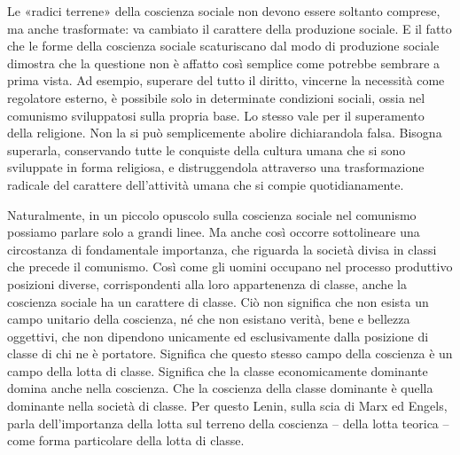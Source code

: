 \documentclass[12pt,a4paper,openany]{book}
\begin{document}
Le «radici terrene» della coscienza sociale non devono essere soltanto comprese, ma anche trasformate: va cambiato il carattere della produzione sociale. E il fatto che le forme della coscienza sociale scaturiscano dal modo di produzione sociale dimostra che la questione non è affatto così semplice come potrebbe sembrare a prima vista. Ad esempio, superare del tutto il diritto, vincerne la necessità come regolatore esterno, è possibile solo in determinate condizioni sociali, ossia nel comunismo sviluppatosi sulla propria base. Lo stesso vale per il superamento della religione. Non la si può semplicemente abolire dichiarandola falsa. Bisogna superarla, conservando tutte le conquiste della cultura umana che si sono sviluppate in forma religiosa, e distruggendola attraverso una trasformazione radicale del carattere dell'attività umana che si compie quotidianamente.

Naturalmente, in un piccolo opuscolo sulla coscienza sociale nel comunismo possiamo parlare solo a grandi linee. Ma anche così occorre sottolineare una circostanza di fondamentale importanza, che riguarda la società divisa in classi che precede il comunismo. Così come gli uomini occupano nel processo produttivo posizioni diverse, corrispondenti alla loro appartenenza di classe, anche la coscienza sociale ha un carattere di classe. Ciò non significa che non esista un campo unitario della coscienza, né che non esistano verità, bene e bellezza oggettivi, che non dipendono unicamente ed esclusivamente dalla posizione di classe di chi ne è portatore. Significa che questo stesso campo della coscienza è un campo della lotta di classe. Significa che la classe economicamente dominante domina anche nella coscienza. Che la coscienza della classe dominante è quella dominante nella società di classe. Per questo Lenin, sulla scia di Marx ed Engels, parla dell'importanza della lotta sul terreno della coscienza – della lotta teorica – come forma particolare della lotta di classe.
\end{document}
